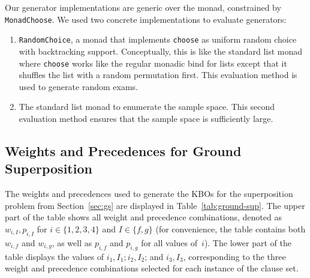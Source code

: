 Our generator implementations are generic over the monad, constrained by \texttt{MonadChoose}.
We used two concrete implementations to evaluate generators:
\begin{enumerate}
    \item
        \texttt{RandomChoice}, a monad that implements \texttt{choose}
        as uniform random choice with backtracking support.
        Conceptually, this is like the standard list monad
        where \texttt{choose} works like the regular monadic bind for lists
        except that it shuffles the list with a random permutation first.
        This evaluation method is used to generate random exams.
    \item
        The standard list monad to enumerate the sample space.
        This second evaluation method ensures that the sample space is sufficiently large.
\end{enumerate}

\subsection{Weights and Precedences for Ground Superposition}\label{appB:FO}

The weights and precedences used to generate the KBOs for the superposition problem
from Section~\ref{sec:gs}
are displayed in Table~\ref{tab:ground-sup}.
The upper part of the table shows all weight and precedence combinations,
denoted as $w_{i, I}, p_{i, I}$ for $i \in \{1, 2, 3, 4\}$
and $I \in \{f, g\}$ (for convenience, the table contains both $w_{i, f}$
and $w_{i, g}$, as well as $p_{i, f}$ and $p_{i, g}$ for all values of~$i$).
The lower part of the table displays the values of $i_1, I_1; i_2, I_2$; and $i_3, I_3$,
corresponding to the three weight and precedence combinations selected for
each instance of the clause set.


